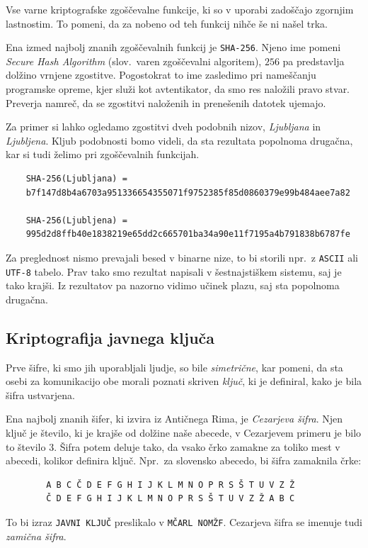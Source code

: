 \documentclass[isrm2, tisk]{fmfdelo}
\begin{document}
\begin{opomba}
    Vse varne kriptografske zgoščevalne funkcije, ki so v uporabi zadoščajo zgornjim lastnostim. To
    pomeni, da za nobeno od teh funkcij nihče še ni našel trka.
\end{opomba}

\begin{primer}
    Ena izmed najbolj znanih zgoščevalnih funkcij je \texttt{SHA-256}. Njeno ime pomeni \textit{Secure 
    Hash Algorithm} (slov.\ varen zgoščevalni algoritem), $256$ pa predstavlja dolžino vrnjene zgostitve. 
    Pogostokrat to ime zasledimo pri nameščanju programske opreme, kjer služi kot avtentikator, da smo res 
    naložili pravo stvar. Preverja namreč, da se zgostitvi naloženih in prenešenih datotek ujemajo.

    Za primer si lahko ogledamo zgostitvi dveh podobnih nizov, \textit{Ljubljana} in \textit{Ljubljena}. 
    Kljub podobnosti bomo videli, da sta rezultata popolnoma drugačna, kar si tudi želimo pri zgoščevalnih 
    funkcijah.
    \begin{verbatim}
    SHA-256(Ljubljana) =
    b7f147d8b4a6703a951336654355071f9752385f85d0860379e99b484aee7a82

    SHA-256(Ljubljena) =
    995d2d8ffb40e1838219e65dd2c665701ba34a90e11f7195a4b791838b6787fe
    \end{verbatim}
    Za preglednost nismo prevajali besed v binarne nize, to bi storili npr.\ z \texttt{ASCII} ali \texttt{UTF-8}
    tabelo. Prav tako smo rezultat napisali v šestnajstiškem sistemu, saj je tako krajši. Iz rezultatov
    pa nazorno vidimo učinek plazu, saj sta popolnoma drugačna.
\end{primer}

\subsection{Kriptografija javnega ključa}
Prve šifre, ki smo jih uporabljali ljudje, so bile \textit{simetrične}, kar pomeni, da sta osebi 
za komunikacijo obe morali poznati skriven \textit{ključ}, ki je definiral, kako je bila šifra 
ustvarjena. 

\begin{primer}
    Ena najbolj znanih šifer, ki izvira iz Antičnega Rima, je \textit{Cezarjeva šifra}. Njen ključ 
    je število, ki je krajše od dolžine naše abecede, v Cezarjevem primeru je bilo to število $3$.
    Šifra potem deluje tako, da vsako črko zamakne za toliko mest v abecedi, kolikor definira 
    ključ. Npr.\ za slovensko abecedo, bi šifra zamaknila črke:
    \begin{verbatim}
        A B C Č D E F G H I J K L M N O P R S Š T U V Z Ž
        Č D E F G H I J K L M N O P R S Š T U V Z Ž A B C
    \end{verbatim}
    To bi izraz \texttt{JAVNI KLJUČ} preslikalo v \texttt{MČARL NOMŽF}. Cezarjeva šifra se imenuje 
    tudi \textit{zamična šifra}.
\end{primer}
\end{document}
